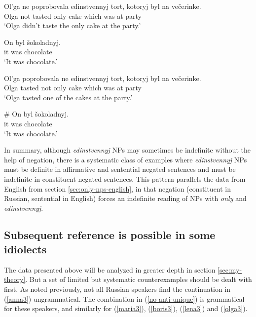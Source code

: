 \begin{exe}
	\ex \begin{xlist}
		\ex \gll Ol'ga ne poprobovala edinstvennyj tort, kotoryj byl na ve\v{c}erinke.\\
		Olga not tasted only cake which was at party\\
		\glt `Olga didn't taste the only cake at the party.'

		\ex \gll On byl \v{s}okoladnyj.\\
		it was chocolate\\
		\glt `It was chocolate.'
	\end{xlist}

	\ex \label{olga3} \begin{xlist}
		\ex \gll Ol'ga poprobovala ne edinstvennyj tort, kotoryj byl na ve\v{c}erinke.\\
		Olga tasted not only cake which was at party\\
		\glt `Olga tasted one of the cakes at the party.'

		\ex \gll \# On byl \v{s}okoladnyj.\\
		{} it was chocolate\\
		\glt `It was chocolate.'
	\end{xlist}
\end{exe}

In summary, although \textit{edinstvennyj} NPs may sometimes be indefinite without the help of negation, there is a systematic class of examples where \textit{edinstvennyj} NPs must be definite in affirmative and sentential negated sentences and must be indefinite in constituent negated sentences. This pattern parallels the data from English from section \ref{sec:only-nps-english}, in that negation (constituent in Russian, sentential in English) forces an indefinite reading of NPs with \textit{only} and \textit{edinstvennyj}.

\subsection{Subsequent reference is possible in some idiolects\label{sec:no-anti-unique}}
The data presented above will be analyzed in greater depth in section \ref{sec:my-theory}. But a set of limited but systematic counterexamples should be dealt with first. As noted previously, not all Russian speakers find the continuation in (\ref{anna3}) ungrammatical. The combination in (\ref{no-anti-unique}) is grammatical for these speakers, and similarly for (\ref{maria3}), (\ref{boris3}), (\ref{lena3}) and (\ref{olga3}).

